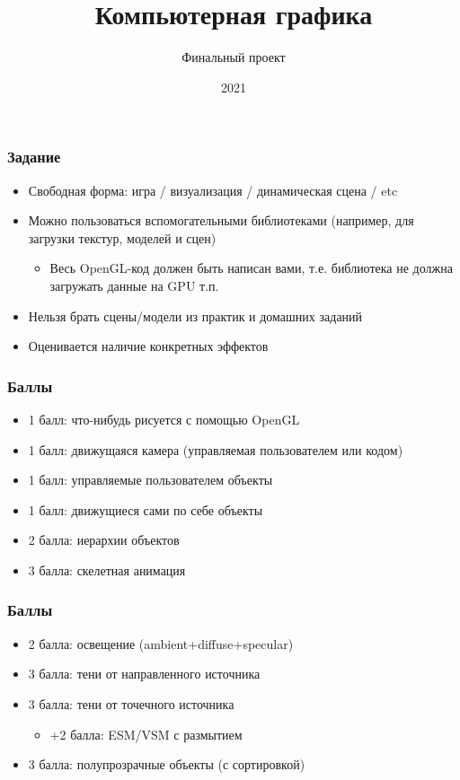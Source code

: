 \documentclass{beamer}
\title{Компьютерная графика}
\subtitle{Финальный проект}
\date{2021}
\begin{document}
\frame{\titlepage}

\begin{frame}[fragile]
\frametitle{Задание}
\begin{itemize}
\item Свободная форма: игра / визуализация / динамическая сцена / etc
\pause
\item Можно пользоваться вспомогательными библиотеками (например, для загрузки текстур, моделей и сцен)
\begin{itemize}
\item Весь OpenGL-код должен быть написан вами, т.е. библиотека не должна загружать данные на GPU  т.п.
\end{itemize}
\pause
\item Нельзя брать сцены/модели из практик и домашних заданий
\pause
\item Оценивается наличие конкретных эффектов
\end{itemize}
\end{frame}

\begin{frame}[fragile]
\frametitle{Баллы}
\begin{itemize}
\item 1 балл: что-нибудь рисуется с помощью OpenGL
\item 1 балл: движущаяся камера (управляемая пользователем или кодом)
\item 1 балл: управляемые пользователем объекты
\item 1 балл: движущиеся сами по себе объекты
\item 2 балла: иерархии объектов
\item 3 балла: скелетная анимация
\end{itemize}
\end{frame}

\begin{frame}[fragile]
\frametitle{Баллы}
\begin{itemize}
\item 2 балла: освещение (ambient+diffuse+specular)
\item 3 балла: тени от направленного источника
\item 3 балла: тени от точечного источника
\begin{itemize}
\item +2 балла: ESM/VSM с размытием
\end{itemize}
\item 3 балла: полупрозрачные объекты (с сортировкой)
\end{itemize}
\end{frame}
\end{document}
